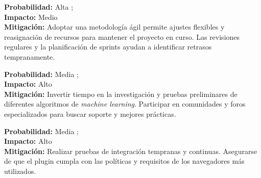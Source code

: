 



\newcommand{\alta}{\textcolor{red}{\ding{55}}}
\newcommand{\media}{\textcolor{orange}{\ding{51}}}
\newcommand{\baja}{\textcolor{green}{\ding{108}}}





\bigskip

\begin{tcolorbox}[riskbox, title=Riesgo 1: Retrasos en el Cronograma]
\textbf{Probabilidad:} Alta \alta; \\
\textbf{Impacto:} Medio \media\\
\textbf{Mitigación:} Adoptar una metodología ágil permite ajustes flexibles y reasignación de recursos para mantener el proyecto en curso. Las revisiones regulares y la planificación de sprints ayudan a identificar retrasos tempranamente.
\end{tcolorbox}

\begin{tcolorbox}[riskbox, title=Riesgo 2: Limitaciones Técnicas con Algoritmos de \textit{Machine Learning}]
\textbf{Probabilidad:} Media \media; \\
\textbf{Impacto:} Alto \alta\\
\textbf{Mitigación:} Invertir tiempo en la investigación y pruebas preliminares de diferentes algoritmos de \textit{machine learning}. Participar en comunidades y foros especializados para buscar soporte y mejores prácticas.
\end{tcolorbox}

\begin{tcolorbox}[riskbox, title=Riesgo 3: Problemas de Integración del \gls{plugin} de Navegador]
\textbf{Probabilidad:} Media \media; \\
\textbf{Impacto:} Alto \alta\\
\textbf{Mitigación:} Realizar pruebas de integración tempranas y continuas. Asegurarse de que el \gls{plugin} cumpla con las políticas y requisitos de los navegadores más utilizados.
\end{tcolorbox}

